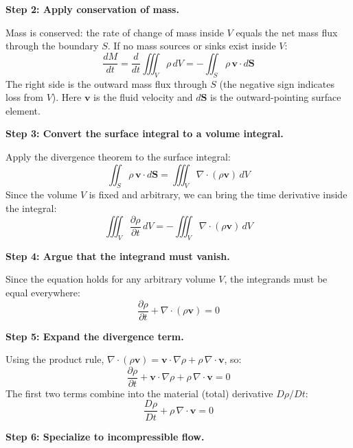 \documentclass[11pt,openright]{book}
\begin{document}
\textbf{Step 2: Apply conservation of mass.}

Mass is conserved: the rate of change of mass inside $V$ equals the net mass flux through the boundary $S$. If no mass sources or sinks exist inside $V$:
\begin{equation}
\frac{dM}{dt} = \frac{d}{dt}\iiint_V \rho\, dV = -\iint_S \rho\,\mathbf{v} \cdot d\mathbf{S}
\end{equation}
The right side is the outward mass flux through $S$ (the negative sign indicates loss from $V$). Here $\mathbf{v}$ is the fluid velocity and $d\mathbf{S}$ is the outward-pointing surface element.

\textbf{Step 3: Convert the surface integral to a volume integral.}

Apply the divergence theorem to the surface integral:
\begin{equation}
\iint_S \rho\,\mathbf{v} \cdot d\mathbf{S} = \iiint_V \nabla \cdot (\rho\mathbf{v})\, dV
\end{equation}
Since the volume $V$ is fixed and arbitrary, we can bring the time derivative inside the integral:
\begin{equation}
\iiint_V \frac{\partial \rho}{\partial t}\, dV = -\iiint_V \nabla \cdot (\rho\mathbf{v})\, dV
\end{equation}

\textbf{Step 4: Argue that the integrand must vanish.}

Since the equation holds for any arbitrary volume $V$, the integrands must be equal everywhere:
\begin{equation}
\frac{\partial \rho}{\partial t} + \nabla \cdot (\rho\mathbf{v}) = 0
\end{equation}

\textbf{Step 5: Expand the divergence term.}

Using the product rule, $\nabla \cdot (\rho\mathbf{v}) = \mathbf{v} \cdot \nabla\rho + \rho\,\nabla \cdot \mathbf{v}$, so:
\begin{equation}
\frac{\partial \rho}{\partial t} + \mathbf{v} \cdot \nabla\rho + \rho\,\nabla \cdot \mathbf{v} = 0
\end{equation}
The first two terms combine into the material (total) derivative $D\rho/Dt$:
\begin{equation}
\frac{D\rho}{Dt} + \rho\,\nabla \cdot \mathbf{v} = 0
\end{equation}

\textbf{Step 6: Specialize to incompressible flow.}
\end{document}

